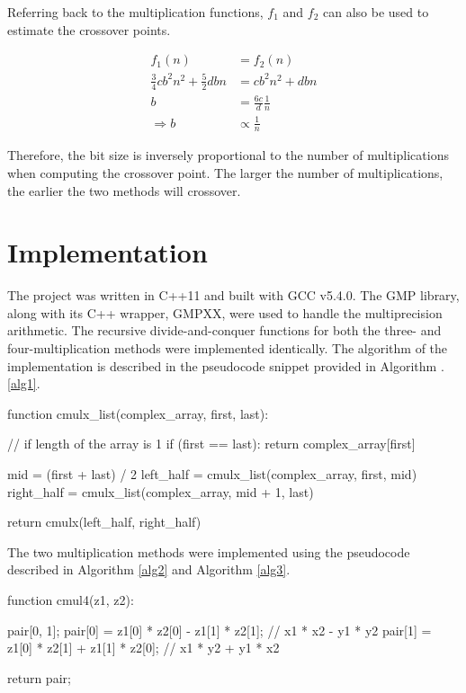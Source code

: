 \documentclass[usletter, 12pt]{article}
\begin{document}
        Referring back to the multiplication functions, $f_1$ and $f_2$ can also be used to estimate the crossover points.

        \begin{equation*}
            \begin{split}
                f_1(n) & = f_2(n) \\
                \frac{3}{4}cb^2n^2+\frac{5}{2}dbn & = cb^2n^2+dbn \\
                b & = \frac{6c}{d}\frac{1}{n} \\
                \Rightarrow b & \propto \frac{1}{n}
            \end{split}
        \end{equation*}

        Therefore, the bit size is inversely proportional to the number of multiplications when computing the crossover point. The larger the number of multiplications, the earlier the two methods will crossover.

    \clearpage
    \newpage
    \section{Implementation}
    The project was written in C++11 and built with GCC v5.4.0. The GMP library, along with its C++ wrapper, GMPXX, were used to handle the multiprecision arithmetic. The recursive divide-and-conquer functions for both the three- and four-multiplication methods were implemented identically. The algorithm of the implementation is described in the pseudocode snippet provided in Algorithm \thesection.\ref{alg1}.

\begin{pseudocode}[caption={Divide and Conquer Multiplication}, label={alg1}]
function cmulx_list(complex_array, first, last):

    // if length of the array is 1
    if (first == last):
        return complex_array[first]

    mid = (first + last) / 2
    left_half = cmulx_list(complex_array, first, mid)
    right_half = cmulx_list(complex_array, mid + 1, last)

    return cmulx(left_half, right_half)

\end{pseudocode}

    The two multiplication methods were implemented using the pseudocode described in Algorithm \ref{alg2} and Algorithm \ref{alg3}.

\begin{pseudocode}[caption={Four Multiplication}, label={alg2}]
function cmul4(z1, z2):

    pair[0, 1];
    pair[0] = z1[0] * z2[0] - z1[1] * z2[1];  // x1 * x2 - y1 * y2
    pair[1] = z1[0] * z2[1] + z1[1] * z2[0];  // x1 * y2 + y1 * x2

    return pair;

\end{pseudocode}
\end{document}
